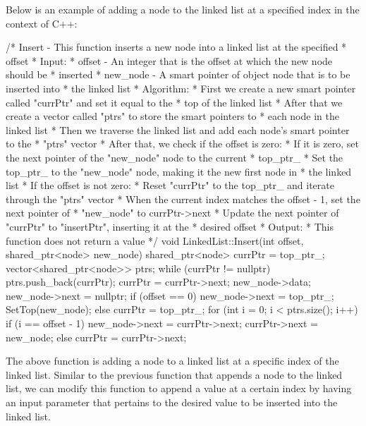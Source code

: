 \begin{highlight}
Below is an example of adding a node to the linked list at a specified index in the context of C++:

\begin{code}
/*  Insert - This function inserts a new node into a linked list at the specified 
*            offset
*   Input:
*     offset - An integer that is the offset at which the new node should be 
*              inserted
*     new_node - A smart pointer of object node that is to be inserted into 
*                the linked list
*   Algorithm:
*     First we create a new smart pointer called "currPtr" and set it equal to the 
*     top of the linked list
*     After that we create a vector called "ptrs" to store the smart pointers to 
*     each node in the linked list
*     Then we traverse the linked list and add each node's smart pointer to the 
*     "ptrs" vector
*     After that, we check if the offset is zero:
*       If it is zero, set the next pointer of the "new_node" node to the current 
*       top_ptr_
*       Set the top_ptr_ to the "new_node" node, making it the new first node in 
*       the linked list
*     If the offset is not zero:
*       Reset "currPtr" to the top_ptr_ and iterate through the "ptrs" vector
*       When the current index matches the offset - 1, set the next pointer of 
*       "new_node" to currPtr->next
*       Update the next pointer of "currPtr" to "insertPtr", inserting it at the 
*       desired offset
*   Output:
*     This function does not return a value
*/
void LinkedList::Insert(int offset, shared_ptr<node> new_node){
    shared_ptr<node> currPtr = top_ptr_;
    vector<shared_ptr<node>> ptrs;
    while (currPtr != nullptr) {
        ptrs.push_back(currPtr);
        currPtr = currPtr->next;
    }
    new_node->data;
    new_node->next = nullptr;
    if (offset == 0) {
        new_node->next = top_ptr_;
        SetTop(new_node);
    }
    else {
    currPtr = top_ptr_;
        for (int i = 0; i < ptrs.size(); i++) {
            if (i == offset - 1) {
            new_node->next = currPtr->next;
            currPtr->next = new_node;
            }
            else {}
            currPtr = currPtr->next;
        }
    }
}
\end{code}

The above function is adding a node to a linked list at a specific index of the linked list. Similar to the previous function that appends a node to the linked list, we can modify this function to
append a value at a certain index by having an input parameter that pertains to the desired value to be inserted into the linked list.

\end{highlight}

